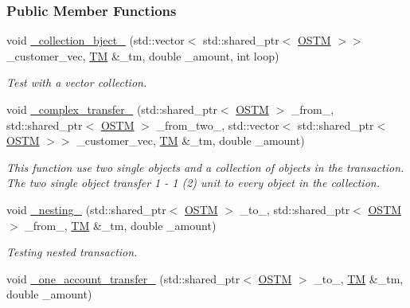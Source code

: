 \subsubsection*{Public Member Functions}
\begin{DoxyCompactItemize}
\item 
void \hyperlink{class_my_test_c_ase_a9ec1ddfc6e7f727446e1a8355086c2dd_a9ec1ddfc6e7f727446e1a8355086c2dd}{\+\_\+collection\+\_\+bject\+\_\+} (std\+::vector$<$ std\+::shared\+\_\+ptr$<$ \hyperlink{class_o_s_t_m}{O\+S\+TM} $>$$>$ \+\_\+customer\+\_\+vec, \hyperlink{class_t_m}{TM} \&\+\_\+tm, double \+\_\+amount, int loop)
\begin{DoxyCompactList}\small\item\em Test with a vector collection. \end{DoxyCompactList}\item 
void \hyperlink{class_my_test_c_ase_a2367b87338c4f61cc3ac3193651580d4_a2367b87338c4f61cc3ac3193651580d4}{\+\_\+complex\+\_\+transfer\+\_\+} (std\+::shared\+\_\+ptr$<$ \hyperlink{class_o_s_t_m}{O\+S\+TM} $>$ \+\_\+from\+\_\+, std\+::shared\+\_\+ptr$<$ \hyperlink{class_o_s_t_m}{O\+S\+TM} $>$ \+\_\+from\+\_\+two\+\_\+, std\+::vector$<$ std\+::shared\+\_\+ptr$<$ \hyperlink{class_o_s_t_m}{O\+S\+TM} $>$$>$ \+\_\+customer\+\_\+vec, \hyperlink{class_t_m}{TM} \&\+\_\+tm, double \+\_\+amount)
\begin{DoxyCompactList}\small\item\em This function use two single objects and a collection of objects in the transaction. The two single object transfer 1 -\/ 1 (2) unit to every object in the collection. \end{DoxyCompactList}\item 
void \hyperlink{class_my_test_c_ase_abb973a1396c1083891d76845e2cfaf64_abb973a1396c1083891d76845e2cfaf64}{\+\_\+nesting\+\_\+} (std\+::shared\+\_\+ptr$<$ \hyperlink{class_o_s_t_m}{O\+S\+TM} $>$ \+\_\+to\+\_\+, std\+::shared\+\_\+ptr$<$ \hyperlink{class_o_s_t_m}{O\+S\+TM} $>$ \+\_\+from\+\_\+, \hyperlink{class_t_m}{TM} \&\+\_\+tm, double \+\_\+amount)
\begin{DoxyCompactList}\small\item\em Testing nested transaction. \end{DoxyCompactList}\item 
void \hyperlink{class_my_test_c_ase_afe25c2ed3a8ab035f472fff6575f0e48_afe25c2ed3a8ab035f472fff6575f0e48}{\+\_\+one\+\_\+account\+\_\+transfer\+\_\+} (std\+::shared\+\_\+ptr$<$ \hyperlink{class_o_s_t_m}{O\+S\+TM} $>$ \+\_\+to\+\_\+, \hyperlink{class_t_m}{TM} \&\+\_\+tm, double \+\_\+amount)

\end{DoxyCompactItemize}
